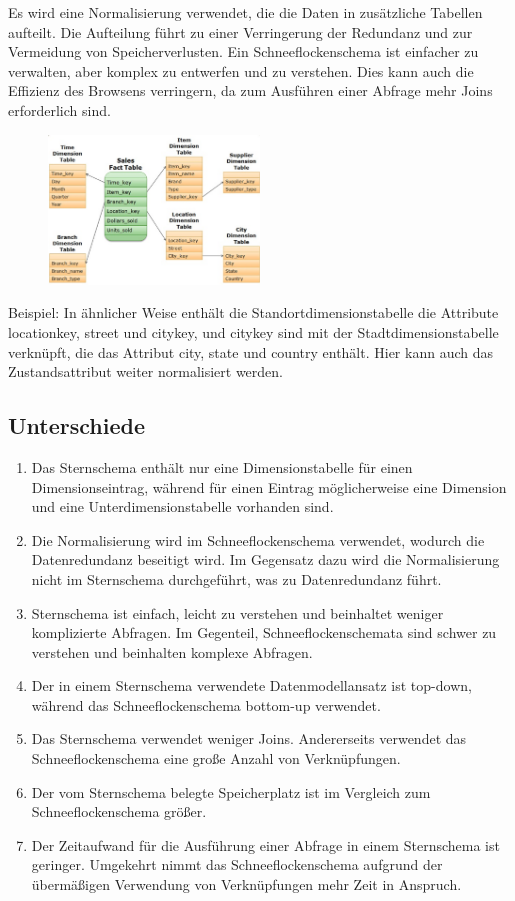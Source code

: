   Es wird eine Normalisierung verwendet, die die Daten in zusätzliche Tabellen aufteilt. Die Aufteilung führt zu einer Verringerung der Redundanz und zur Vermeidung von Speicherverlusten. Ein Schneeflockenschema ist einfacher zu verwalten, aber komplex zu entwerfen und zu verstehen. Dies kann auch die Effizienz des Browsens verringern, da zum Ausführen einer Abfrage mehr Joins erforderlich sind.
  
\begin{figure}[H]
    \centering
    \includegraphics[width=0.5\textwidth]{Content/images/dwh/snow.png}
    \caption{}
\end{figure}

Beispiel:
In ähnlicher Weise enthält die Standortdimensionstabelle die Attribute locationkey, street und citykey, und citykey sind mit der Stadtdimensionstabelle verknüpft, die das Attribut city, state und country enthält. Hier kann auch das Zustandsattribut weiter normalisiert werden.

\subsection{Unterschiede}

\begin{enumerate}
    \item Das Sternschema enthält nur eine Dimensionstabelle für einen Dimensionseintrag, während für einen Eintrag möglicherweise eine Dimension und eine Unterdimensionstabelle vorhanden sind.
    \item Die Normalisierung wird im Schneeflockenschema verwendet, wodurch die Datenredundanz beseitigt wird. Im Gegensatz dazu wird die Normalisierung nicht im Sternschema durchgeführt, was zu Datenredundanz führt.
    \item Sternschema ist einfach, leicht zu verstehen und beinhaltet weniger komplizierte Abfragen. Im Gegenteil, Schneeflockenschemata sind schwer zu verstehen und beinhalten komplexe Abfragen.
    \item Der in einem Sternschema verwendete Datenmodellansatz ist top-down, während das Schneeflockenschema bottom-up verwendet.
    \item Das Sternschema verwendet weniger Joins. Andererseits verwendet das Schneeflockenschema eine große Anzahl von Verknüpfungen.
    \item Der vom Sternschema belegte Speicherplatz ist im Vergleich zum Schneeflockenschema größer.
    \item Der Zeitaufwand für die Ausführung einer Abfrage in einem Sternschema ist geringer. Umgekehrt nimmt das Schneeflockenschema aufgrund der übermäßigen Verwendung von Verknüpfungen mehr Zeit in Anspruch.
    
\end{enumerate}

